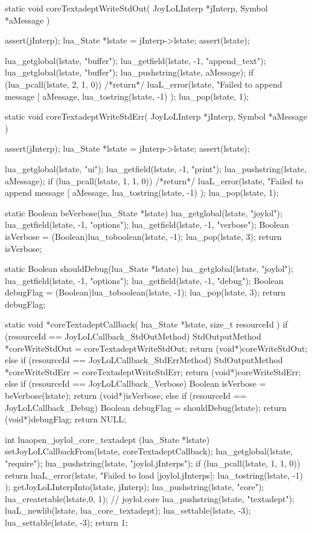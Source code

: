static void coreTextadeptWriteStdOut(
  JoyLoLInterp *jInterp,
  Symbol       *aMessage
) {
  assert(jInterp);
  lua_State *lstate = jInterp->lstate;
  assert(lstate);

  lua_getglobal(lstate, "buffer");
  lua_getfield(lstate, -1, "append_text");
  lua_getglobal(lstate, "buffer");
  lua_pushstring(lstate, aMessage);
  if (lua_pcall(lstate, 2, 1, 0)) {
    /*return*/ luaL_error(lstate,
      "Failed to append message [%
      aMessage,
      lua_tostring(lstate, -1)
    );
  }
  lua_pop(lstate, 1);
}

static void coreTextadeptWriteStdErr(
  JoyLoLInterp *jInterp,
  Symbol       *aMessage
) {
  assert(jInterp);
  lua_State *lstate = jInterp->lstate;
  assert(lstate);

  lua_getglobal(lstate, "ui");
  lua_getfield(lstate, -1, "print");
  lua_pushstring(lstate, aMessage);
  if (lua_pcall(lstate, 1, 1, 0)) {
    /*return*/ luaL_error(lstate,
      "Failed to append message [%
      aMessage,
      lua_tostring(lstate, -1)
    );
  }
  lua_pop(lstate, 1);
}

static Boolean beVerbose(lua_State *lstate) {
  lua_getglobal(lstate, "joylol");
  lua_getfield(lstate, -1, "options");
  lua_getfield(lstate, -1, "verbose");
  Boolean isVerbose = (Boolean)lua_toboolean(lstate, -1);
  lua_pop(lstate, 3);
  return isVerbose;
}

static Boolean shouldDebug(lua_State *lstate) {
  lua_getglobal(lstate, "joylol");
  lua_getfield(lstate, -1, "options");
  lua_getfield(lstate, -1, "debug");
  Boolean debugFlag = (Boolean)lua_toboolean(lstate, -1);
  lua_pop(lstate, 3);
  return debugFlag;
}

static void *coreTextadeptCallback(
  lua_State *lstate,
  size_t resourceId
) {
  if (resourceId == JoyLoLCallback_StdOutMethod) {
    StdOutputMethod *coreWriteStdOut =
      coreTextadeptWriteStdOut;
    return (void*)coreWriteStdOut;
  } else if (resourceId == JoyLoLCallback_StdErrMethod) {
    StdOutputMethod *coreWriteStdErr =
      coreTextadeptWriteStdErr;
    return (void*)coreWriteStdErr;
  } else if (resourceId == JoyLoLCallback_Verbose) {
    Boolean isVerbose = beVerbose(lstate);
    return (void*)isVerbose;
  } else if (resourceId == JoyLoLCallback_Debug) {
    Boolean debugFlag = shouldDebug(lstate);
    return (void*)debugFlag;
  }
  return NULL;
} 

int luaopen_joylol_core_textadept (lua_State *lstate) {
  setJoyLoLCallbackFrom(lstate, coreTextadeptCallback);
  lua_getglobal(lstate, "require");
  lua_pushstring(lstate, "joylol.jInterps");
  if (lua_pcall(lstate, 1, 1, 0)) {
    return luaL_error(lstate,
      "Failed to load [joylol.jInterps]\nERROR:\n%
      lua_tostring(lstate, -1)
    );
  }
  getJoyLoLInterpInto(lstate, jInterp);
  lua_pushstring(lstate, "core");
  lua_createtable(lstate,0, 1); // joylol.core 
  lua_pushstring(lstate, "textadept");
  luaL_newlib(lstate, lua_core_textadept);
  lua_settable(lstate, -3);
  lua_settable(lstate, -3);
  return 1;
}
\stopCCode
